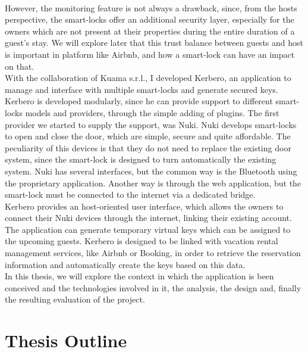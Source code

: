 \\ However, the monitoring feature is not always a drawback, since, from the hosts perspective, the smart-locks offer an additional security layer, especially for the owners which are not present at their properties during the entire duration of a guest's stay.
We will explore later that this trust balance between guests and host is important in platform like Airbnb, and how a smart-lock can have an impact on that.
\\ With the collaboration of Kuama s.r.l., I developed Kerbero, an application to manage and interface with multiple smart-locks and generate secured keys. Kerbero is developed modularly, since he can provide support to different smart-locks models and providers, through the simple adding of plugins. The first provider we started to supply the support, was Nuki. Nuki develops smart-locks to open and close the door, which are simple, secure and quite affordable. The peculiarity of this devices is that they do not need to replace the existing door system, since the smart-lock is designed to turn automatically the existing system. Nuki has several interfaces, but the common way is the Bluetooth using the proprietary application. Another way is through the web application, but the smart-lock must be connected to the internet via a dedicated bridge.
\\ Kerbero provides an host-oriented user interface, which allows the owners to connect their Nuki devices through the internet, linking their existing account. The application can generate temporary virtual keys which can be assigned to the upcoming guests. Kerbero is designed to be linked with vacation rental management services, like \gls{Airbnb} or \gls{Booking}, in order to retrieve the reservation information and automatically create the keys based on this data.
\\ In this thesis, we will explore the context in which the application is been conceived and the technologies involved in it, the analysis, the design and, finally the resulting evaluation of the project.
 
\section{Thesis Outline}

